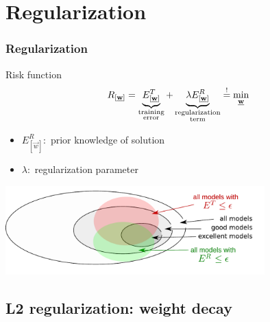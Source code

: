 \section{Regularization}


\begin{frame}\frametitle{Regularization}
	\begin{block}{Risk function}
		\begin{equation*}
			R_{[\underline{\mathbf{w}}]} = \underbrace{ E_{[\underline{\mathbf{w}}]}^T }_{
					\substack{\text{training} \\ \text{error}}}
				+ \underbrace{ \lambda E_{[\underline{\mathbf{w}}]}^R }_{
					\substack{\text{regularization} \\ \text{term}}}
				\stackrel{\mathrm{!}}{=} \min_{\underline{\mathbf{w}}}
		\end{equation*}
		\begin{itemize}
			\item $E^R_{[\vec w]}:$ prior knowledge of solution
			\item $\lambda:$ regularization parameter 
		\end{itemize}
	\end{block}
	
	\begin{center}
		\includegraphics[width=10cm]{img/ModelSelection_models_v2.pdf}
	\end{center}
\end{frame}

\subsection{L2 regularization: weight decay}

